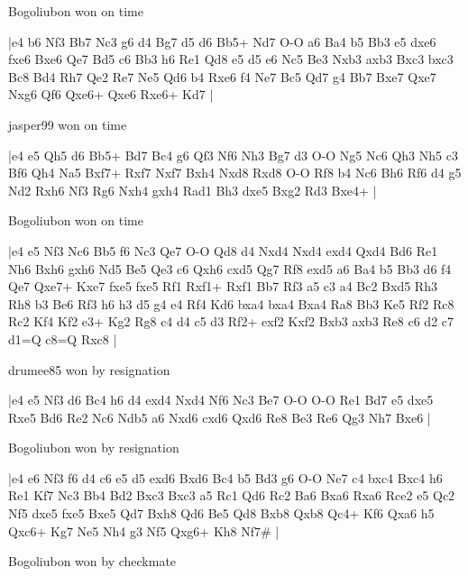 \showboard

Bogoliubon won on time

\makegametitle
|e4 b6 Nf3 Bb7 Nc3 g6 d4 Bg7 d5 d6 Bb5+ Nd7 O-O a6 Ba4 b5 Bb3 e5 dxe6 fxe6 Bxe6 Qe7 Bd5 c6 Bb3 h6 Re1 Qd8 e5 d5 e6 Nc5 Be3 Nxb3 axb3 Bxc3 bxc3 Bc8 Bd4 Rh7 Qe2 Re7 Ne5 Qd6 b4 Rxe6 f4 Ne7 Bc5 Qd7 g4 Bb7 Bxe7 Qxe7 Nxg6 Qf6 Qxe6+ Qxe6 Rxe6+ Kd7  |

\showboard

jasper99 won on time

\makegametitle
|e4 e5 Qh5 d6 Bb5+ Bd7 Bc4 g6 Qf3 Nf6 Nh3 Bg7 d3 O-O Ng5 Nc6 Qh3 Nh5 c3 Bf6 Qh4 Na5 Bxf7+ Rxf7 Nxf7 Bxh4 Nxd8 Rxd8 O-O Rf8 b4 Nc6 Bh6 Rf6 d4 g5 Nd2 Rxh6 Nf3 Rg6 Nxh4 gxh4 Rad1 Bh3 dxe5 Bxg2 Rd3 Bxe4+  |

\showboard

Bogoliubon won on time

\makegametitle
|e4 e5 Nf3 Nc6 Bb5 f6 Nc3 Qe7 O-O Qd8 d4 Nxd4 Nxd4 exd4 Qxd4 Bd6 Re1 Nh6 Bxh6 gxh6 Nd5 Be5 Qe3 c6 Qxh6 cxd5 Qg7 Rf8 exd5 a6 Ba4 b5 Bb3 d6 f4 Qe7 Qxe7+ Kxe7 fxe5 fxe5 Rf1 Rxf1+ Rxf1 Bb7 Rf3 a5 c3 a4 Bc2 Bxd5 Rh3 Rh8 b3 Be6 Rf3 h6 h3 d5 g4 e4 Rf4 Kd6 bxa4 bxa4 Bxa4 Ra8 Bb3 Ke5 Rf2 Rc8 Rc2 Kf4 Kf2 e3+ Kg2 Rg8 c4 d4 c5 d3 Rf2+ exf2 Kxf2 Bxb3 axb3 Re8 c6 d2 c7 d1=Q c8=Q Rxc8  |

\showboard

drumee85 won by resignation

\makegametitle
|e4 e5 Nf3 d6 Bc4 h6 d4 exd4 Nxd4 Nf6 Nc3 Be7 O-O O-O Re1 Bd7 e5 dxe5 Rxe5 Bd6 Re2 Nc6 Ndb5 a6 Nxd6 cxd6 Qxd6 Re8 Be3 Re6 Qg3 Nh7 Bxe6  |

\showboard

Bogoliubon won by resignation

\makegametitle
|e4 e6 Nf3 f6 d4 c6 e5 d5 exd6 Bxd6 Bc4 b5 Bd3 g6 O-O Ne7 c4 bxc4 Bxc4 h6 Re1 Kf7 Nc3 Bb4 Bd2 Bxc3 Bxc3 a5 Rc1 Qd6 Rc2 Ba6 Bxa6 Rxa6 Rce2 e5 Qc2 Nf5 dxe5 fxe5 Bxe5 Qd7 Bxh8 Qd6 Be5 Qd8 Bxb8 Qxb8 Qc4+ Kf6 Qxa6 h5 Qxc6+ Kg7 Ne5 Nh4 g3 Nf5 Qxg6+ Kh8 Nf7\#  |

\showboard

Bogoliubon won by checkmate


